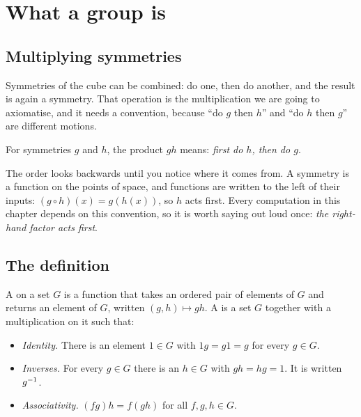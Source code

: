 \section{What a group is}\label{sec:def}

\subsection{Multiplying symmetries}

Symmetries of the cube can be combined: do one, then do another, and the result is again a
symmetry. That operation is the multiplication we are going to axiomatise, and it needs a
convention, because ``do $g$ then $h$'' and ``do $h$ then $g$'' are different motions.

\begin{defi}\label{def:order}
For symmetries $g$ and $h$, the product $gh$ means: \emph{first do $h$, then do $g$}.
\end{defi}

The order looks backwards until you notice where it comes from. A symmetry is a function on the
points of space, and functions are written to the left of their inputs: $(g\circ h)(x)=g(h(x))$, so
$h$ acts first. Every computation in this chapter depends on this convention, so it is worth
saying out loud once: \emph{the right-hand factor acts first}.


\subsection{The definition}

\begin{defi}\label{def:group}
A  on a set $G$ is a function that takes an ordered pair of elements of $G$ and
returns an element of $G$, written $(g,h)\mapsto gh$. A  is a set $G$ together with a
multiplication on it such that:
\begin{itemize}[nosep,leftmargin=1.4em]
\item[\textbf{(G1)}] \emph{Identity.} There is an element $1\in G$ with $1g=g1=g$ for every
$g\in G$.
\item[\textbf{(G2)}] \emph{Inverses.} For every $g\in G$ there is an $h\in G$ with $gh=hg=1$. It is
written $g^{-1}$.
\item[\textbf{(G3)}] \emph{Associativity.} $(fg)h=f(gh)$ for all $f,g,h\in G$.
\end{itemize}
\end{defi}

